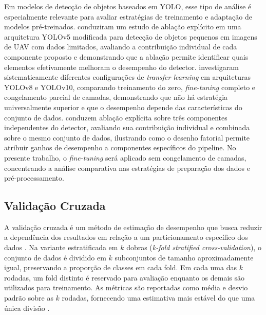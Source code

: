 \documentclass[
    12pt,                %
    openright,           %
    oneside,             %
    a4paper,             %
    english,             %
    brazil               %
]{abntex2}
\begin{document}
Em modelos de detecção de objetos baseados em YOLO, esse tipo 
de análise é especialmente relevante para avaliar estratégias 
de treinamento e adaptação de modelos pré-treinados. 
 conduziram um estudo de ablação 
explícito em uma arquitetura YOLOv5 modificada para detecção 
de objetos pequenos em imagens de UAV com dados limitados, 
avaliando a contribuição individual de cada componente 
proposto e demonstrando que a ablação permite identificar 
quais elementos efetivamente melhoram o desempenho do detector. 
 investigaram sistematicamente 
diferentes configurações de \textit{transfer learning} em 
arquiteturas YOLOv8 e YOLOv10, comparando treinamento do 
zero, \textit{fine-tuning} completo e congelamento parcial 
de camadas, demonstrando que não há estratégia universalmente 
superior e que o desempenho depende das características do 
conjunto de dados.  conduzem ablação 
explícita sobre três componentes independentes do detector, 
avaliando sua contribuição individual e combinada sobre o 
mesmo conjunto de dados, ilustrando como o desenho fatorial 
permite atribuir ganhos de desempenho a componentes 
específicos do pipeline. No presente trabalho, o 
\textit{fine-tuning} será aplicado sem congelamento de 
camadas, concentrando a análise comparativa nas estratégias 
de preparação dos dados e pré-processamento.

\subsection{Validação Cruzada}
\label{subsec:validacao_cruzada}

A validação cruzada é um método de estimação de desempenho que busca
reduzir a dependência dos resultados em relação a um particionamento
específico dos dados \cite{Kohavi1995}. Na variante estratificada em
$k$ dobras (\textit{k-fold stratified cross-validation}), o conjunto
de dados é dividido em $k$ subconjuntos de tamanho aproximadamente
igual, preservando a proporção de classes em cada fold. Em cada uma
das $k$ rodadas, um fold distinto é reservado para avaliação enquanto
os demais são utilizados para treinamento. As métricas são reportadas
como média e desvio padrão sobre as $k$ rodadas, fornecendo uma
estimativa mais estável do que uma única divisão \cite{Kohavi1995}.
\end{document}
